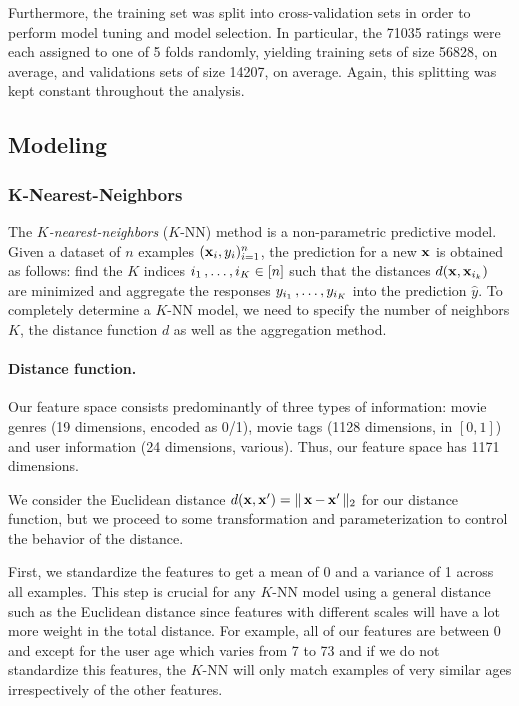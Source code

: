 \documentclass[bj, preprint]{imsart}
\begin{document}
Furthermore, the training set was split into cross-validation sets in order to perform model tuning and model selection. 
In particular, the \num{71035} ratings were each assigned to one of 5 folds randomly, yielding training sets of size \num{56828}, on average, and validations sets of size \num{14207}, on average. 
Again, this splitting was kept constant throughout the analysis.

\subsection{Modeling}\label{subsec:method.models}

\subsubsection{K-Nearest-Neighbors}\label{subsubsec:method.models.knn}

The \textit{$K$-nearest-neighbors} ($K$-NN) method is a non-parametric predictive model. 
Given a dataset of $n$ examples $(\operatorname{\mathbf x}_i, y_i)_{i=1}^n$, the prediction for a new $\operatorname{\mathbf x}$ is obtained as follows: find the $K$ indices $i_1\operatorname{,\ldots ,} i_K\in[n]$ such that the distances $d(\operatorname{\mathbf x}, \operatorname{\mathbf x}_{i_k})$ are minimized and aggregate the responses $y_{i_1}\operatorname{,\ldots ,} y_{i_K}$ into the prediction $\hat{y}$.
To completely determine a $K$-NN model, we need to specify the number of neighbors $K$, the distance function $d$ as well as the aggregation method.

\paragraph{Distance function.}\label{par:method.models.knn.distance}

Our feature space consists predominantly of three types of information: movie genres (19 dimensions, encoded as 0/1), movie tags (1128 dimensions, in $[0,1]$) and user information (24 dimensions, various). Thus, our feature space has \num{1171} dimensions. 

We consider the Euclidean distance $d(\operatorname{\mathbf x},\operatorname{\mathbf x}')=\Vert\operatorname{\mathbf x}-\operatorname{\mathbf x}'\Vert_2$ for our distance function, but we proceed to some transformation and parameterization to control the behavior of the distance. 

First, we standardize the features to get a mean of 0 and a variance of 1 across all examples. This step is crucial for any $K$-NN model using a general distance such as the Euclidean distance since features with different scales will have a lot more weight in the total distance. For example, all of our features are between 0 and except for the user age which varies from 7 to 73 and if we do not standardize this features, the $K$-NN will only match examples of very similar ages irrespectively of the other features.
\end{document}
